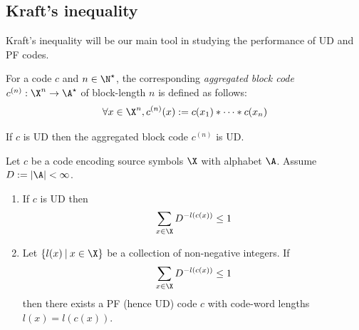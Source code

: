 \documentclass[toc, titlepaged]{../cs-classes/cs-classes}
\begin{document}
\subsection{Kraft's inequality}
Kraft's inequality will be our main tool in studying the performance of UD and PF codes.

\begin{definition}
    For a code $c$ and $n\in \N^\star$, the corresponding \emph{aggregated block code} $c^{(n)} : \X^n\to \A^\star$ of block-length $n$ is defined as follows:
    \begin{equation*}
        \forall x\in \X^n, c^{(n)}(x) := c(x_1) * \dots * c(x_n)
    \end{equation*}
\end{definition}

\begin{lemma}
    If $c$ is UD then the aggregated block code $c^{(n)}$ is UD.
\end{lemma}


\begin{theorem}
    Let $c$ be a code encoding source symbols $\X$ with alphabet $\A$. Assume $D:=|\A|<\infty$. 
    \begin{enumerate}
        \item If $c$ is UD then
        \begin{equation}
            \label{eq:kraft-ineq}
            \sum_{x\in\X} D^{-l(c(x))}\leq 1
        \end{equation}

        \item Let $\{l(x)\:|\:x\in\X\}$ be a collection of non-negative integers. If
        \begin{equation*}
            \sum_{x\in\X} D^{-l(c(x))}\leq 1
        \end{equation*}
        then there exists a PF (hence UD) code $c$ with code-word lengths $l(x)=l(c(x))$.
    \end{enumerate}
\end{theorem}
\end{document}
